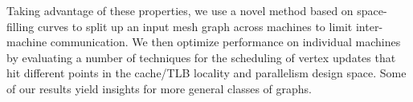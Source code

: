Taking advantage of these properties, we use a novel method 
based on space-filling curves to split up an input mesh graph 
across machines to limit inter-machine communication. We then 
optimize performance on individual machines by evaluating a 
number of techniques for the scheduling of vertex updates that 
hit different points in the cache/TLB locality and parallelism 
design space. Some of our results yield insights for more 
general classes of graphs.














